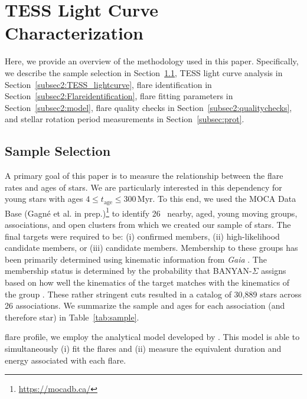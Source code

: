 \documentclass[twocolumn, linenumbers]{aastex631}
\begin{document}
\section{TESS Light Curve Characterization}\label{sec:methods}

Here, we provide an overview of the methodology used in this paper. Specifically, we describe the sample selection in Section~\ref{subsec2:sample}, TESS light curve analysis in
Section~\ref{subsec2:TESS_lightcurve}, flare identification in Section~\ref{subsec2:Flareidentification}, flare fitting parameters in Section~\ref{subsec2:model}, flare quality
checks in Section~\ref{subsec2:qualitychecks}, and  stellar rotation period measurements in Section~\ref{subsec:prot}.

\subsection{Sample Selection}\label{subsec2:sample}

A primary goal of this paper is to measure the relationship between the flare rates and ages of stars. We are particularly interested in this dependency for young stars with ages
$4 \leq t_\textrm{age} \leq 300$\,Myr. To this end, we used the MOCA Data Base (Gagné et al. in prep.)\footnote{\url{https://mocadb.ca/}} to identify 26~ nearby, aged, young moving
groups, associations, and open clusters from which we created our sample of stars. The final targets were required to be: (i) confirmed members, (ii) high-likelihood candidate members,
or (iii) candidate members.  Membership to these groups has been primarily determined using kinematic information from \textit{Gaia} \citep{gaia16, gaia18}. The membership status is
determined by the probability that BANYAN-$\Sigma$ assigns based on how well the kinematics of the target matches with the kinematics of the group \citep{gagne18}. These rather
stringent cuts resulted in a catalog of 30,889 stars across 26 associations. We summarize the sample and ages for each association (and therefore star) in Table~\ref{tab:sample}.

flare profile, we employ the analytical model developed by \cite{tovar22}. This model is able to simultaneously (i) fit the flares and  (ii) measure the equivalent duration and energy
associated with each flare.
\end{document}
